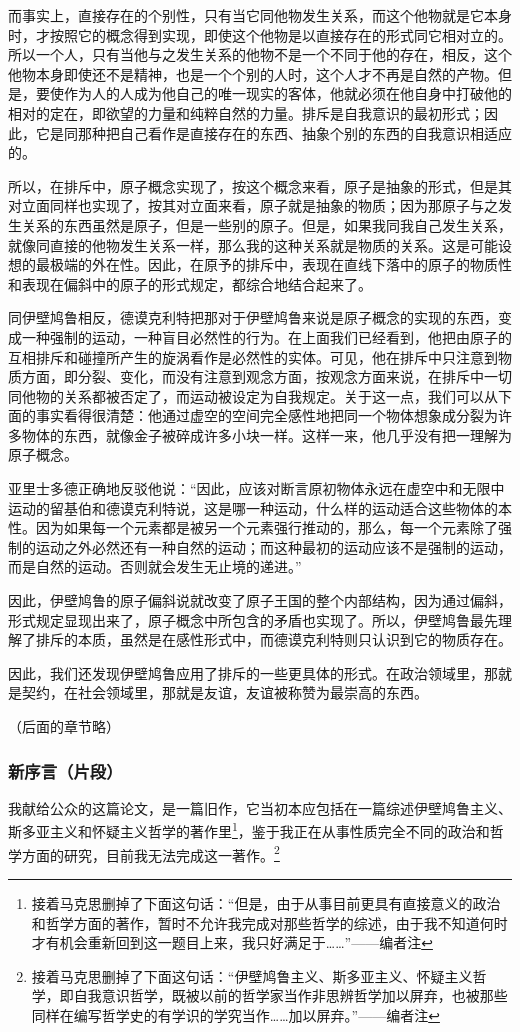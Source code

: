 \documentclass[a4paper,twoside,12pt]{ctexart}
\begin{document}
而事实上，直接存在的个别性，只有当它同他物发生关系，而这个他物就是它本身时，才按照它的概念得到实现，即使这个他物是以直接存在的形式同它相对立的。所以一个人，只有当他与之发生关系的他物不是一个不同于他的存在，相反，这个他物本身即使还不是精神，也是一个个别的人时，这个人才不再是自然的产物。但是，要使作为人的人成为他自己的唯一现实的客体，他就必须在他自身中打破他的相对的定在，即欲望的力量和纯粹自然的力量。排斥是自我意识的最初形式；因此，它是同那种把自己看作是直接存在的东西、抽象个别的东西的自我意识相适应的。

所以，在排斥中，原子概念实现了，按这个概念来看，原子是抽象的形式，但是其对立面同样也实现了，按其对立面来看，原子就是抽象的物质；因为那原子与之发生关系的东西虽然是原子，但是一些别的原子。但是，如果我同我自己发生关系，就像同直接的他物发生关系一样，那么我的这种关系就是物质的关系。这是可能设想的最极端的外在性。因此，在原予的排斥中，表现在直线下落中的原子的物质性和表现在偏斜中的原子的形式规定，都综合地结合起来了。

同伊壁鸠鲁相反，德谟克利特把那对于伊壁鸠鲁来说是原子概念的实现的东西，变成一种强制的运动，一种盲目必然性的行为。在上面我们已经看到，他把由原子的互相排斥和碰撞所产生的旋涡看作是必然性的实体。可见，他在排斥中只注意到物质方面，即分裂、变化，而没有注意到观念方面，按观念方面来说，在排斥中一切同他物的关系都被否定了，而运动被设定为自我规定。关于这一点，我们可以从下面的事实看得很清楚：他通过虚空的空间完全感性地把同一个物体想象成分裂为许多物体的东西，就像金子被碎成许多小块一样。这样一来，他几乎没有把一理解为原子概念。

亚里士多德正确地反驳他说：“因此，应该对断言原初物体永远在虚空中和无限中运动的留基伯和德谟克利特说，这是哪一种运动，什么样的运动适合这些物体的本性。因为如果每一个元素都是被另一个元素强行推动的，那么，每一个元素除了强制的运动之外必然还有一种自然的运动；而这种最初的运动应该不是强制的运动，而是自然的运动。否则就会发生无止境的递进。”

因此，伊壁鸠鲁的原子偏斜说就改变了原子王国的整个内部结构，因为通过偏斜，形式规定显现出来了，原子概念中所包含的矛盾也实现了。所以，伊壁鸠鲁最先理解了排斥的本质，虽然是在感性形式中，而德谟克利特则只认识到它的物质存在。

因此，我们还发现伊壁鸠鲁应用了排斥的一些更具体的形式。在政治领域里，那就是契约，在社会领域里，那就是友谊，友谊被称赞为最崇高的东西。

（后面的章节略）
\subsubsection{新序言（片段）}
我献给公众的这篇论文，是一篇旧作，它当初本应包括在一篇综述伊壁鸠鲁主义、斯多亚主义和怀疑主义哲学的著作里\footnote{接着马克思删掉了下面这句话：“但是，由于从事目前更具有直接意义的政治和哲学方面的著作，暂时不允许我完成对那些哲学的综述，由于我不知道何时才有机会重新回到这一题目上来，我只好满足于……”——编者注}，鉴于我正在从事性质完全不同的政治和哲学方面的研究，目前我无法完成这一著作。\footnote{接着马克思删掉了下面这句话：“伊壁鸠鲁主义、斯多亚主义、怀疑主义哲学，即自我意识哲学，既被以前的哲学家当作非思辨哲学加以屏弃，也被那些同样在编写哲学史的有学识的学究当作……加以屏弃。”——编者注}
\end{document}

